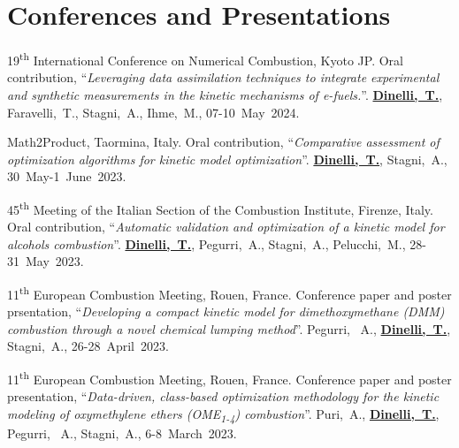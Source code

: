 
\section{\sc Conferences and Presentations}
\begin{etaremune}
   \item
      19\textsuperscript{th} International Conference on Numerical Combustion, Kyoto JP.
      Oral contribution, ``{\it Leveraging data assimilation techniques to integrate
      experimental and synthetic measurements in the kinetic mechanisms of e-fuels.}''.
      {\bf \underline{Dinelli,~T.}}, Faravelli,~T., Stagni,~A., Ihme,~M.,
      07-10~May~2024.

   \item
      Math2Product, Taormina, Italy. Oral contribution, ``{\it Comparative
      assessment of optimization algorithms for kinetic model optimization}''.
      {\bf \underline{Dinelli,~T.}}, Stagni,~A.,
      30~May-1~June~2023.

   \item
      45\textsuperscript{th} Meeting of the Italian Section of the Combustion Institute,
      Firenze, Italy. Oral contribution, ``{\it Automatic validation and optimization
      of a kinetic model for alcohols combustion}''. {\bf \underline{Dinelli,~T.}},
      Pegurri,~A., Stagni,~A., Pelucchi,~M.,
      28-31~May~2023.

   \item
      11\textsuperscript{th} European Combustion Meeting, Rouen, France. Conference paper
      and poster prsentation, ``{\it Developing a compact kinetic model for
      dimethoxymethane (DMM) combustion through a novel chemical lumping method}''.
      Pegurri, ~A., {\bf \underline{Dinelli,~T.}}, Stagni,~A.,
      26-28~April~2023.

   \item
      11\textsuperscript{th} European Combustion Meeting, Rouen, France. Conference paper
      and poster presentation, ``{\it Data-driven, class-based optimization methodology
      for the kinetic modeling of oxymethylene ethers (OME\textsubscript{1-4}) combustion}''.
      Puri,~A., {\bf \underline{Dinelli,~T.}}, Pegurri, ~A., Stagni,~A.,
      6-8~March~2023.


\end{etaremune}
